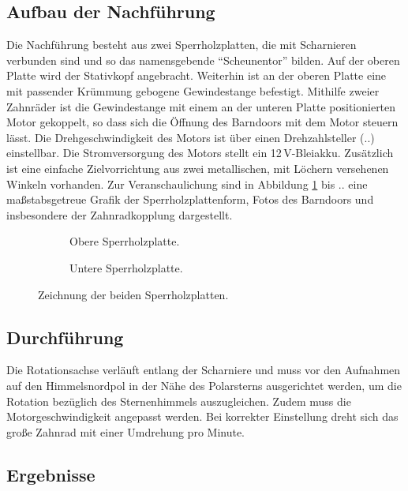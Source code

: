 \subsection{Aufbau der Nachführung}

Die Nachführung besteht aus zwei Sperrholzplatten, die mit Scharnieren verbunden
sind und so das namensgebende \enquote{Scheunentor} bilden. Auf der oberen
Platte wird der Stativkopf angebracht. Weiterhin ist an der oberen Platte eine
mit passender Krümmung gebogene Gewindestange befestigt. Mithilfe zweier
Zahnräder ist die Gewindestange mit einem an der unteren Platte positionierten
Motor gekoppelt, so dass sich die Öffnung des Barndoors mit dem Motor steuern
lässt. Die Drehgeschwindigkeit des Motors ist über einen Drehzahlsteller (..)
einstellbar. Die Stromversorgung des Motors stellt ein 12\,V-Bleiakku.
Zusätzlich ist eine einfache Zielvorrichtung aus zwei metallischen, mit Löchern
versehenen Winkeln vorhanden. Zur Veranschaulichung sind in Abbildung
\ref{Schema} bis .. eine maßstabsgetreue Grafik der Sperrholzplattenform, Fotos
des Barndoors und insbesondere der Zahnradkopplung dargestellt.


\begin{figure}\centering%
\begin{subfigure}{0.75\columnwidth}
\caption{Obere Sperrholzplatte.}
\end{subfigure}

\begin{subfigure}{0.75\columnwidth}
\caption{Untere Sperrholzplatte.}
\end{subfigure}
\caption{Zeichnung der beiden Sperrholzplatten.}%
\label{Schema}
\end{figure}

\subsection{Durchführung}

Die Rotationsachse verläuft entlang der Scharniere und muss vor den Aufnahmen
auf den Himmelsnordpol in der Nähe des Polarsterns ausgerichtet werden, um die
Rotation bezüglich des Sternenhimmels auszugleichen. Zudem muss die
Motorgeschwindigkeit angepasst werden. Bei korrekter Einstellung dreht sich das
große Zahnrad mit einer Umdrehung pro Minute.


\subsection{Ergebnisse}


